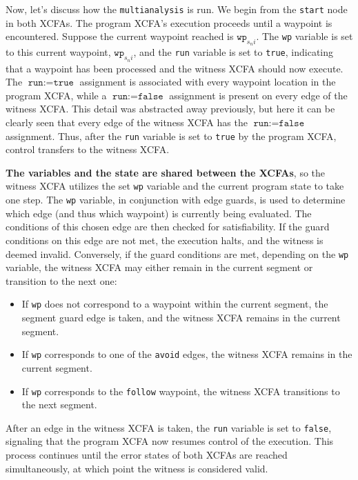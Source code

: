 Now, let's discuss how the \texttt{multianalysis} is run. We begin from the \texttt{start} node in both XCFAs. 
The program XCFA's execution proceeds until a waypoint is encountered. Suppose the current waypoint 
reached is $\texttt{wp}_{s_ni}$.
The \texttt{wp} variable is set to this current waypoint, $\texttt{wp}_{s_ni}$, and the \texttt{run}
variable is set to \texttt{true}, indicating that a waypoint has been processed and the witness XCFA 
should now execute. The $\texttt{run} := \texttt{true}$ assignment is associated with every waypoint
location in the program XCFA, while a $\texttt{run} := \texttt{false}$ assignment is present on every
edge of the witness XCFA. This detail was abstracted away previously, but here it can be clearly seen 
that every edge of the witness XCFA has the $\texttt{run} := \texttt{false}$ assignment.
Thus, after the \texttt{run} variable is set to \texttt{true} by the program XCFA, control transfers to the witness XCFA.



\textbf{The variables and the state are shared between the XCFAs}, so the witness XCFA utilizes the set
\texttt{wp} variable and the current program state to take one step.
The \texttt{wp} variable, in conjunction with edge guards, is used to determine which edge (and thus 
which waypoint) is currently being evaluated. The conditions of this chosen edge are then checked for satisfiability.
If the guard conditions on this edge are not met, the execution halts, and the witness is deemed invalid. 
Conversely, if the guard conditions are met, depending on the \texttt{wp} variable, the witness XCFA may 
either remain in the current segment or transition to the next one:
\begin{itemize}
    \item If \texttt{wp} does not correspond to a waypoint within the current segment, the segment 
      guard edge is taken, and the witness XCFA remains in the current segment.
    \item If \texttt{wp} corresponds to one of the \texttt{avoid} edges, the witness XCFA remains 
      in the current segment.
    \item If \texttt{wp} corresponds to the \texttt{follow} waypoint, the witness XCFA transitions 
      to the next segment.
\end{itemize}
After an edge in the witness XCFA is taken, the \texttt{run} variable is set to \texttt{false}, 
signaling that the program XCFA now resumes control of the execution.
This process continues until the error states of both XCFAs are reached simultaneously, at which point 
the witness is considered valid.

